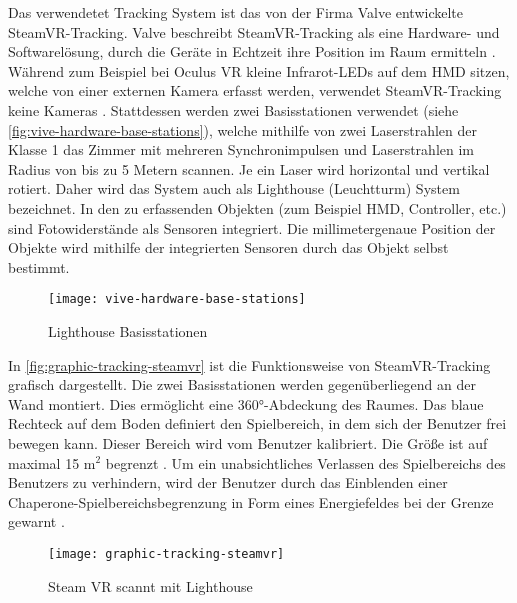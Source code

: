 Das verwendetet Tracking System ist das von der Firma Valve entwickelte SteamVR-Tracking. Valve beschreibt SteamVR-Tracking als eine Hardware- und Softwarelösung, durch die Geräte in Echtzeit ihre Position im Raum ermitteln \cite{Valve.2020}. Während zum Beispiel bei Oculus VR kleine Infrarot-LEDs auf dem \ac{HMD} sitzen, welche von einer externen Kamera erfasst werden, verwendet SteamVR-Tracking keine Kameras \cite{Sauter.2015}. Stattdessen werden zwei Basisstationen verwendet (siehe \autoref{fig:vive-hardware-base-stations}), welche mithilfe von zwei Laserstrahlen der Klasse 1 \glqq das Zimmer mit mehreren Synchronimpulsen und Laserstrahlen im Radius von bis zu 5 Metern\grqq \cite{Valve.2020} scannen. Je ein Laser wird horizontal und vertikal rotiert. Daher wird das System auch als Lighthouse (Leuchtturm) System bezeichnet. In den zu erfassenden Objekten (zum Beispiel \ac{HMD}, Controller, etc.) sind Fotowiderstände als Sensoren integriert. Die millimetergenaue Position der Objekte wird mithilfe der integrierten Sensoren durch das Objekt selbst bestimmt. \cite{Yates.20160512}

\begin{figure}[!htbp]
	\centering
	\texttt{[image: vive-hardware-base-stations]}
	\caption[Lighthouse Basisstationen]{Lighthouse Basisstationen \cite{ViveBaseStation}}
	\label{fig:vive-hardware-base-stations}
\end{figure}

In \autoref{fig:graphic-tracking-steamvr} ist die Funktionsweise von SteamVR-Tracking grafisch dargestellt. Die zwei Basisstationen werden gegenüberliegend an der Wand montiert. Dies ermöglicht eine 360°-Abdeckung des Raumes. Das blaue Rechteck auf dem Boden definiert den Spielbereich, in dem sich der Benutzer frei bewegen kann. Dieser Bereich wird vom Benutzer kalibriert. Die Größe ist auf maximal 15 m$^2$ begrenzt \cite{ViveProduct}. Um ein unabsichtliches Verlassen des Spielbereichs des Benutzers zu verhindern, wird der Benutzer durch das Einblenden einer Chaperone-Spielbereichsbegrenzung in Form eines Energiefeldes bei der Grenze gewarnt \cite{ViveProduct}. 

\begin{figure}[!htbp]
	\centering
	\texttt{[image: graphic-tracking-steamvr]}
	\caption[Steam VR scannt mit Lighthouse]{Steam VR scannt mit Lighthouse \cite{Sauter.2015}}
	\label{fig:graphic-tracking-steamvr}
\end{figure}

